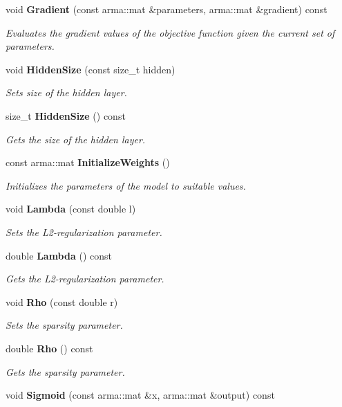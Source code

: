 \begin{DoxyCompactItemize}
void \textbf{ Gradient} (const arma\+::mat \&parameters, arma\+::mat \&gradient) const
\begin{DoxyCompactList}\small\item\em Evaluates the gradient values of the objective function given the current set of parameters. \end{DoxyCompactList}\item 
void \textbf{ Hidden\+Size} (const size\+\_\+t hidden)
\begin{DoxyCompactList}\small\item\em Sets size of the hidden layer. \end{DoxyCompactList}\item 
size\+\_\+t \textbf{ Hidden\+Size} () const
\begin{DoxyCompactList}\small\item\em Gets the size of the hidden layer. \end{DoxyCompactList}\item 
const arma\+::mat \textbf{ Initialize\+Weights} ()
\begin{DoxyCompactList}\small\item\em Initializes the parameters of the model to suitable values. \end{DoxyCompactList}\item 
void \textbf{ Lambda} (const double l)
\begin{DoxyCompactList}\small\item\em Sets the L2-\/regularization parameter. \end{DoxyCompactList}\item 
double \textbf{ Lambda} () const
\begin{DoxyCompactList}\small\item\em Gets the L2-\/regularization parameter. \end{DoxyCompactList}\item 
void \textbf{ Rho} (const double r)
\begin{DoxyCompactList}\small\item\em Sets the sparsity parameter. \end{DoxyCompactList}\item 
double \textbf{ Rho} () const
\begin{DoxyCompactList}\small\item\em Gets the sparsity parameter. \end{DoxyCompactList}\item 
void \textbf{ Sigmoid} (const arma\+::mat \&x, arma\+::mat \&output) const

\end{DoxyCompactItemize}
